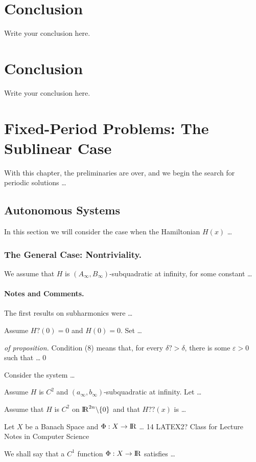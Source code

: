 \documentclass{llncs}
\begin{document}
\section{Conclusion}
Write your conclusion here.


\section{Conclusion}
Write your conclusion here.


\section{Fixed-Period Problems: The Sublinear Case}
%
With this chapter, the preliminaries are over, and we begin the
search for periodic solutions \dots
%
\subsection{Autonomous Systems}
%
In this section we will consider the case when the Hamiltonian
$H(x)$ \dots
%
\subsubsection*{The General Case: Nontriviality.}
%
We assume that $H$ is
$\left(A_{\infty}, B_{\infty}\right)$-subqua\-dra\-tic
at infinity, for some constant \dots
%
\paragraph{Notes and Comments.}
The first results on subharmonics were \dots
%
\begin{proposition}
Assume $H?(0)=0$ and $ H(0)=0$. Set \dots
\end{proposition}
\begin{proof}[of proposition]
Condition (8) means that, for every $\delta?>\delta$, there is
some $\varepsilon>0$ such that \dots \qed
\end{proof}
%
\begin{example}
Consider the system \dots
\end{example}
\begin{corollary}
Assume $H$ is $C^{2}$ and
$\left(a_{\infty}, b_{\infty}\right)$-subquadratic
at infinity. Let \dots
\end{corollary}
\begin{lemma}
Assume that $H$ is $C^{2}$ on ${\rm I\!R}^{2n}\backslash \{0\}$
and that $H??(x)$ is \dots
\end{lemma}
\begin{theorem}
Let $X$ be a Banach Space and $\Phi:X\to{\rm I\!R}$ \dots
14 LATEX2? Class for Lecture Notes in Computer Science
\end{theorem}
\begin{definition}
We shall say that a $C^{1}$ function $\Phi:X\to{\rm I\!R}$
satisfies \dots
\end{definition}
\end{document}
